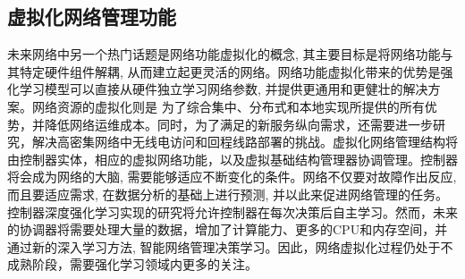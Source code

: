 \documentclass{IEEEtran}
\begin{document}
%
%


\subsection{虚拟化网络管理功能}

未来网络中另一个热门话题是网络功能虚拟化的概念, 其主要目标是将网络功能与其特定硬件组件解耦, 从而建立起更灵活的网络。网络功能虚拟化带来的优势是强化学习模型可以直接从硬件独立学习网络参数, 并提供更通用和更健壮的解决方案。网络资源的虚拟化则是 为了综合集中、分布式和本地实现所提供的所有优势，并降低网络运维成本。同时，为了满足的新服务纵向需求，还需要进一步研究，解决高密集网络中无线电访问和回程线路部署的挑战。虚拟化网络管理结构将由控制器实体，相应的虚拟网络功能，以及虚拟基础结构管理器协调管理。控制器将会成为网络的大脑, 需要能够适应不断变化的条件。网络不仅要对故障作出反应, 而且要适应需求, 在数据分析的基础上进行预测, 并以此来促进网络管理的任务。控制器深度强化学习实现的研究将允许控制器在每次决策后自主学习。然而，未来的协调器将需要处理大量的数据，增加了计算能力、更多的CPU和内存空间，并通过新的深入学习方法, 智能网络管理决策学习。因此，网络虚拟化过程仍处于不成熟阶段，需要强化学习领域内更多的关注。
\end{document}
